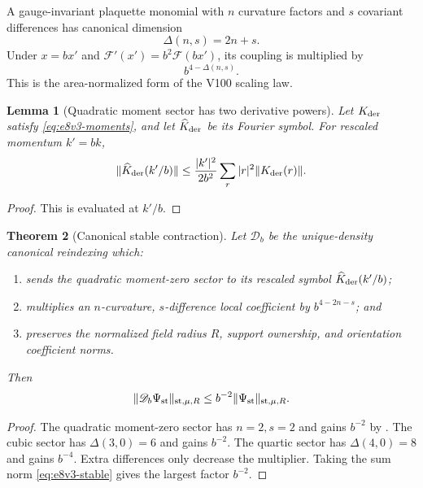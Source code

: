 \documentclass[11pt,oneside]{book}
\newtheorem{theorem}{Theorem}[chapter]
\newtheorem{lemma}[theorem]{Lemma}
\theoremstyle{definition}
\theoremstyle{remark}
\begin{document}
A gauge-invariant plaquette monomial with \(n\) curvature factors and
\(s\) covariant differences has canonical dimension
\[
 \Delta(n,s)=2n+s.                                   \label{eq:e8v3-dimension}
\]
Under \(x=bx'\) and
\({\mathcal F}'(x')=b^2{\mathcal F}(bx')\), its coupling is multiplied
by
\[
 b^{4-\Delta(n,s)}.                                  \label{eq:e8v3-multiplier}
\]
This is the area-normalized form of the V100 scaling law.

\begin{lemma}[Quadratic moment sector has two derivative powers]
\label{lem:e8v3-quadratic-scale}
Let \(K_{\rm der}\) satisfy \eqref{eq:e8v3-moments}, and let
\(\widehat K_{\rm der}\) be its Fourier symbol.  For rescaled momentum
\(k'=bk\),
\[
 \|\widehat K_{\rm der}(k'/b)\|
 \leq
 \frac{|k'|^2}{2b^2}
 \sum_r|r|^2\|K_{\rm der}(r)\|.                      \label{eq:e8v3-quadratic-scale}
\]
\end{lemma}

\begin{proof}
This is  evaluated at \(k'/b\).
\end{proof}

\begin{theorem}[Canonical stable contraction]
\label{thm:e8v3-contraction}
Let \({\mathscr D}_b\) be the unique-density canonical reindexing which:
\begin{enumerate}[label=\textup{(\roman*)},leftmargin=3.5em]
\item sends the quadratic moment-zero sector to its rescaled symbol
      \(\widehat K_{\rm der}(k'/b)\);
\item multiplies an \(n\)-curvature, \(s\)-difference local
      coefficient by \(b^{4-2n-s}\); and
\item preserves the normalized field radius \(R\), support ownership,
      and orientation coefficient norms.
\end{enumerate}
Then
\[
 \|{\mathscr D}_b\Psi_{\rm st}\|_{{\rm st},\mu,R}
 \leq
 b^{-2}\|\Psi_{\rm st}\|_{{\rm st},\mu,R}.           \label{eq:e8v3-contraction}
\]
\end{theorem}

\begin{proof}
The quadratic moment-zero sector has \(n=2,s=2\) and gains \(b^{-2}\)
by .  The cubic sector has
\(\Delta(3,0)=6\) and gains \(b^{-2}\).  The quartic sector has
\(\Delta(4,0)=8\) and gains \(b^{-4}\).  Extra differences only
decrease the multiplier.  Taking the sum norm
\eqref{eq:e8v3-stable} gives the largest factor \(b^{-2}\).
\end{proof}
\end{document}
